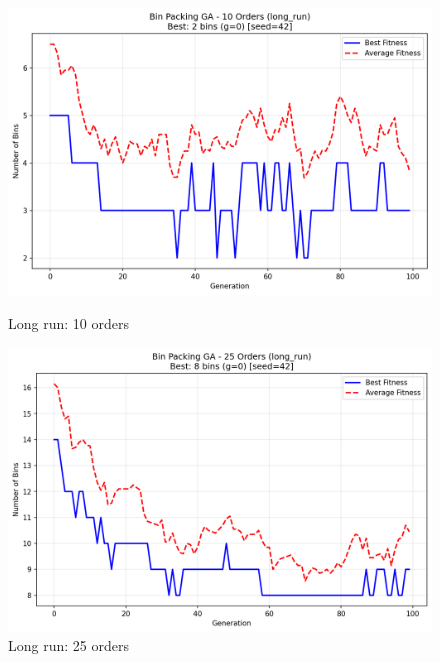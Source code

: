 \documentclass[journal,12pt,onecolumn]{IEEEtran}
\begin{document}
\begin{figure}[htbp]
\begin{minipage}{0.48\textwidth}
    \centering
    \includegraphics[width=\textwidth]{bpp_10items_long_run_seed42.png}
    \caption{Long run: 10 orders}
    \label{fig:long_run_10}
\end{minipage}\hfill
\begin{minipage}{0.48\textwidth}
    \centering
    \includegraphics[width=\textwidth]{bpp_25items_long_run_seed42.png}
    \caption{Long run: 25 orders}
    \label{fig:long_run_25}
\end{minipage}
\end{figure}
\end{document}
